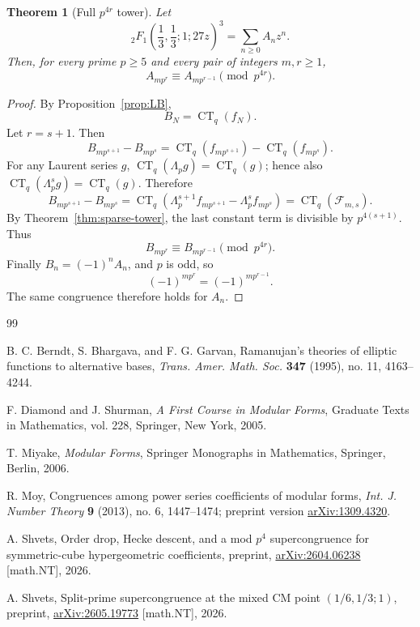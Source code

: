 \documentclass[11pt]{amsart}
\newtheorem{theorem}{Theorem}[section]
\theoremstyle{remark}
\DeclareMathOperator{\CT}{CT}
\newcommand{\Up}{\Lambda_p}
\begin{document}
\begin{theorem}[Full $p^{4r}$ tower]\label{thm:main}
Let
\[
 {}_2F_1\!\left(\frac13,\frac13;1;27z\right)^3=\sum_{n\ge0}A_nz^n.
\]
Then, for every prime $p\ge5$ and every pair of integers $m,r\ge1$,
\[
 A_{mp^r}\equiv A_{mp^{r-1}}\pmod {p^{4r}}.
\]
\end{theorem}

\begin{proof}
By Proposition~\ref{prop:LB},
\[
 B_N=\CT_q(f_N).
\]
Let $r=s+1$.  Then
\[
 B_{mp^{s+1}}-B_{mp^s}
 =\CT_q(f_{mp^{s+1}})-\CT_q(f_{mp^s}).
\]
For any Laurent series $g$, $\CT_q(\Up g)=\CT_q(g)$; hence also $\CT_q(\Up^s g)=\CT_q(g)$.  Therefore
\[
 B_{mp^{s+1}}-B_{mp^s}
 =\CT_q\left(\Up^{s+1}f_{mp^{s+1}}-\Up^sf_{mp^s}\right)
 =\CT_q(\mathcal F_{m,s}).
\]
By Theorem~\ref{thm:sparse-tower}, the last constant term is divisible by $p^{4(s+1)}$.  Thus
\[
 B_{mp^r}\equiv B_{mp^{r-1}}\pmod {p^{4r}}.
\]
Finally $B_n=(-1)^nA_n$, and $p$ is odd, so
\[
 (-1)^{mp^r}=(-1)^{mp^{r-1}}.
\]
The same congruence therefore holds for $A_n$.
\end{proof}

\begin{thebibliography}{99}

B. C. Berndt, S. Bhargava, and F. G. Garvan,
Ramanujan's theories of elliptic functions to alternative bases,
\emph{Trans. Amer. Math. Soc.} \textbf{347} (1995), no. 11, 4163--4244.

F. Diamond and J. Shurman,
\emph{A First Course in Modular Forms},
Graduate Texts in Mathematics, vol. 228, Springer, New York, 2005.

T. Miyake,
\emph{Modular Forms},
Springer Monographs in Mathematics, Springer, Berlin, 2006.

R. Moy,
Congruences among power series coefficients of modular forms,
\emph{Int. J. Number Theory} \textbf{9} (2013), no. 6, 1447--1474;
preprint version \href{https://arxiv.org/abs/1309.4320}{arXiv:1309.4320}.

A. Shvets,
Order drop, Hecke descent, and a mod $p^4$ supercongruence for symmetric-cube hypergeometric coefficients,
preprint, \href{https://arxiv.org/abs/2604.06238}{arXiv:2604.06238} [math.NT], 2026.

A. Shvets,
Split-prime supercongruence at the mixed CM point $(1/6,1/3;1)$,
preprint, \href{https://arxiv.org/abs/2605.19773}{arXiv:2605.19773} [math.NT], 2026.

\end{thebibliography}
\end{document}
